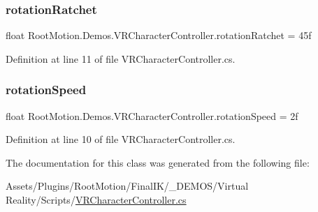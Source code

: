 \subsubsection{\texorpdfstring{rotation\+Ratchet}{rotationRatchet}}
{\footnotesize\ttfamily float Root\+Motion.\+Demos.\+V\+R\+Character\+Controller.\+rotation\+Ratchet = 45f}



Definition at line 11 of file V\+R\+Character\+Controller.\+cs.

\mbox{\label{class_root_motion_1_1_demos_1_1_v_r_character_controller_af8dce185b85e4f417c6be878447044fd}} 
\subsubsection{\texorpdfstring{rotation\+Speed}{rotationSpeed}}
{\footnotesize\ttfamily float Root\+Motion.\+Demos.\+V\+R\+Character\+Controller.\+rotation\+Speed = 2f}



Definition at line 10 of file V\+R\+Character\+Controller.\+cs.



The documentation for this class was generated from the following file\+:\begin{DoxyCompactItemize}
\item 
Assets/\+Plugins/\+Root\+Motion/\+Final\+I\+K/\+\_\+\+D\+E\+M\+O\+S/\+Virtual Reality/\+Scripts/\mbox{\hyperlink{_v_r_character_controller_8cs}{V\+R\+Character\+Controller.\+cs}}\end{DoxyCompactItemize}
